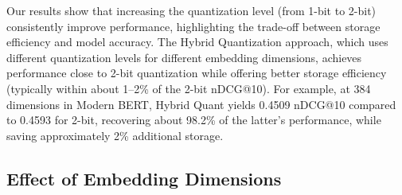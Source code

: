 Our results show that increasing the quantization level (from 1-bit to 2-bit) consistently improve performance, highlighting the trade-off between storage efficiency and model accuracy. 
The Hybrid Quantization approach, which uses different quantization levels for different embedding dimensions, achieves performance close to 2-bit quantization while offering better storage efficiency  (typically within about 1--2\% of the 2-bit nDCG@10). 
For example, at 384 dimensions in Modern BERT, Hybrid Quant yields 0.4509 nDCG@10 compared to 0.4593 for 2-bit, recovering about 98.2\% of the latter's performance, while saving approximately 2\% additional storage. 

\subsection{Effect of Embedding Dimensions}
\label{sec:dimension_effect}

